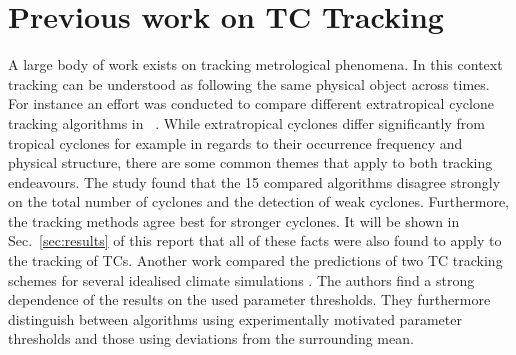 \section{Previous work on TC Tracking}\label{sec:tracking}
A large body of work exists on tracking metrological phenomena. In this context tracking can be understood as following the same physical object across times.\newline
For instance an effort was conducted to compare different extratropical cyclone tracking algorithms in ~\cite{extratropical}. While extratropical cyclones differ significantly from tropical cyclones for example in regards to their occurrence frequency and physical structure, there are some common themes that apply to both tracking endeavours. The study found that the 15 compared algorithms disagree strongly on the total number of cyclones and the detection of weak cyclones. Furthermore, the tracking methods agree best for stronger cyclones. It will be shown in Sec.~\ref{sec:results} of this report that all of these facts were also found to apply to the tracking of TCs.\newline
Another work compared the predictions of two TC tracking schemes for several idealised climate simulations \cite{comp-climate-schemes}. The authors find a strong dependence of the results on the used parameter thresholds. They furthermore distinguish between algorithms using experimentally motivated parameter thresholds and those using deviations from the surrounding mean.
